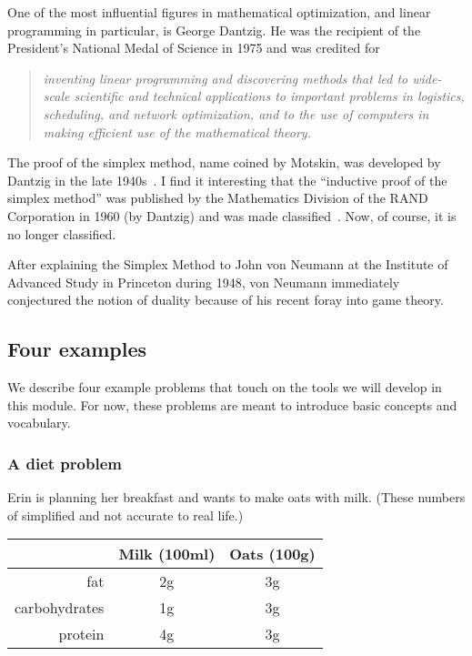 \documentclass[a4paper, 12pt]{article}
\numberwithin{equation}{section}
\numberwithin{figure}{section}
\theoremstyle{definition}
\begin{document}
One of the most influential figures in mathematical optimization, and linear
programming in particular, is George Dantzig. He was the recipient of the
President's National Medal of Science in 1975 \cite{NSF} and was credited for 
\begin{quote}
	\emph{inventing linear programming and discovering methods that led to wide-scale scientific and technical applications to important problems in logistics, scheduling, and network optimization, and to the use of computers in making efficient use of the mathematical theory.}
\end{quote}
The proof of the simplex method, name coined by Motskin, was developed by
Dantzig in the late 1940s~\cite{Dantzig}. I find it interesting that the
``inductive proof of the simplex method'' was published by the Mathematics
Division of the RAND Corporation in 1960 (by Dantzig) and was made
classified~\cite{SimplexMethod}. Now, of course, it is no longer classified.

After explaining the Simplex Method to John von Neumann at the Institute of
Advanced Study in Princeton during 1948, von Neumann immediately conjectured the
notion of duality because of his recent foray into game theory. 

\subsection{Four examples}

We describe four example problems that touch on the tools we will develop in
this module. For now, these problems are meant to introduce basic concepts and
vocabulary.

\subsubsection{A diet problem}

Erin is planning her breakfast and wants to make oats with milk. (These
numbers of simplified and not accurate to real life.)
\begin{center}
	\begin{tabular}{|r|c|c|} \hline
		& Milk (100ml) & Oats (100g) \\ \hline 
		fat & 2g & 3g \\ 
		carbohydrates & 1g & 3g \\
		protein & 4g & 3g \\ \hline
	\end{tabular}
\end{center}
\end{document}
